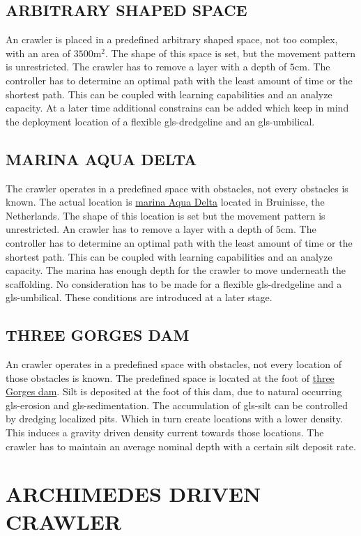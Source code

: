 \subsection{ARBITRARY SHAPED SPACE}\label{sec:usecase1}
An crawler is placed in a predefined arbitrary shaped space, not too complex, with an area of \( 3500 
\si{\square\metre} \). The shape of this space is set, but the movement pattern is unrestricted. The crawler has to 
remove a layer with a depth of \( 5 \si{\cm} \). The controller has to determine an optimal path with the least 
amount of time or the shortest path. This can be coupled with learning capabilities and an analyze capacity. At a 
later time additional constrains can be added which keep in mind the deployment location of a flexible 
\gls{gls-dredgeline} and an \gls{gls-umbilical}.

\subsection{MARINA AQUA DELTA}\label{sec:usecase2}
The crawler operates in a predefined space with obstacles, not every obstacles is known. The actual location is 
\href{https://www.google.nl/maps/place/Jachthaven+Bruinisse/@51.6712838,4.0824101,
15z/data=!4m2!3m1!1s0x0:0x9c840ab80bde39c8}{marina Aqua Delta} located in Bruinisse, the Netherlands. The shape of 
this location is set but the movement pattern is unrestricted. An crawler has to remove a layer with a depth of \( 5 
\si{\cm} \). The controller has to determine an optimal path with the least amount of time or the shortest path. This
can be coupled with learning capabilities and an analyze capacity. The marina has enough depth for the crawler to 
move underneath the scaffolding.
No consideration has to be made for a flexible \gls{gls-dredgeline} and a \gls{gls-umbilical}. These conditions are 
introduced at a later stage.

\subsection{THREE GORGES DAM}\label{sec:usecase3}
An crawler operates in a predefined space with obstacles, not every location of those obstacles is known. The 
predefined space is located at the foot of \href{https://www.google.nl/maps/place/Three+Gorges+Dam/@30.8263416,111
.0118356,16z/data=!4m2!3m1!1s0x368476d5e9a340d9:0xa017b4d524bd9d6c}{three Gorges dam}. Silt is deposited at the foot 
of this dam, due to natural occurring \gls{gls-erosion} and \gls{gls-sedimentation}. The accumulation of 
\gls{gls-silt} can be controlled by dredging localized pits. Which in turn create locations with a lower density. 
This induces a gravity driven density current towards those locations. The crawler has to maintain an average nominal
depth with a certain silt deposit rate.


\section{ARCHIMEDES DRIVEN CRAWLER}
